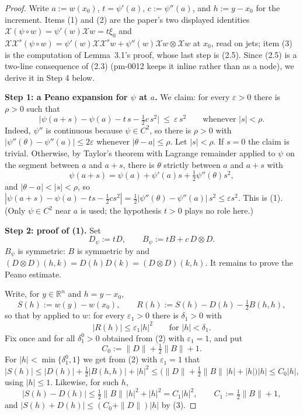 \begin{proof}
Write $a:=w(x_0)$, $t=\psi'(a)$, $c:=\psi''(a)$, and $h:=y-x_0$ for the increment. Items
(1) and (2) are the paper's two displayed identities
$\mathcal X(\psi\circ w)=\psi'(w)\mathcal Xw=t\xi_0$ and
$\mathcal X\mathcal X^{s}(\psi\circ w)=\psi'(w)\mathcal X\mathcal X^{s}w+\psi''(w)\mathcal Xw\otimes\mathcal Xw$
at $x_0$, read on jets; item (3) is the computation of Lemma~3.1's proof, whose last step is
(2.5). Since (2.5) is a two-line consequence of (2.3) (pm-0012 keeps it
inline rather than as a node), we derive it in Step 4 below.

\medskip\noindent\textbf{Step 1: a Peano expansion for $\psi$ at $a$.} We claim: for every
$\varepsilon>0$ there is $\rho>0$ such that
\[
 \Big|\psi(a+s)-\psi(a)-t\,s-\tfrac12c\,s^{2}\Big|\ \le\ \varepsilon\,s^{2}
 \qquad\text{whenever }|s|<\rho. \tag{1}
\]
Indeed, $\psi''$ is continuous because $\psi\in C^{2}$, so there is $\rho>0$ with
$|\psi''(\theta)-\psi''(a)|\le2\varepsilon$ whenever $|\theta-a|\le\rho$. Let $|s|<\rho$.
If $s=0$ the claim is trivial. Otherwise, by Taylor's theorem with Lagrange remainder
applied to $\psi$ on the segment between $a$ and $a+s$, there is $\theta$ strictly between
$a$ and $a+s$ with
\[
 \psi(a+s)=\psi(a)+\psi'(a)s+\tfrac12\psi''(\theta)s^{2},
\]
and $|\theta-a|<|s|<\rho$, so
$|\psi(a+s)-\psi(a)-ts-\frac12cs^{2}|=\frac12|\psi''(\theta)-\psi''(a)|\,s^{2}\le\varepsilon s^{2}$.
This is (1). (Only $\psi\in C^{2}$ near $a$ is used; the hypothesis $t>0$ plays no role
here.)

\medskip\noindent\textbf{Step 2: proof of (1).} Set
\[
 D_\psi:=tD,\qquad B_\psi:=tB+c\,D\otimes D .
\]
$B_\psi$ is symmetric: $B$ is symmetric by  and
$(D\otimes D)(h,k)=D(h)D(k)=(D\otimes D)(k,h)$. It remains to prove the Peano estimate.

Write, for $y\in\mathbb R^{n}$ and $h=y-x_0$,
\[
 S(h):=w(y)-w(x_0),\qquad R(h):=S(h)-D(h)-\tfrac12B(h,h),
\]
so that by  applied to $w$: for every $\varepsilon_1>0$ there is
$\delta_1>0$ with
\[
 |R(h)|\le\varepsilon_1|h|^{2}\qquad\text{for }|h|<\delta_1. \tag{2}
\]
Fix once and for all $\delta_1^{0}>0$ obtained from (2) with $\varepsilon_1=1$, and put
\[
 C_0:=\|D\|+\tfrac12\|B\|+1 .
\]
For $|h|<\min\{\delta_1^{0},1\}$ we get from (2) with $\varepsilon_1=1$ that
\[
 |S(h)|\le|D(h)|+\tfrac12|B(h,h)|+|h|^{2}\le\big(\|D\|+\tfrac12\|B\|\,|h|+|h|\big)|h|
 \le C_0|h|, \tag{3}
\]
using $|h|\le1$. Likewise, for such $h$,
\[
 |S(h)-D(h)|\le\tfrac12\|B\|\,|h|^{2}+|h|^{2}=C_1|h|^{2},\qquad
 C_1:=\tfrac12\|B\|+1 , \tag{4}
\]
and $|S(h)+D(h)|\le(C_0+\|D\|)|h|$ by (3).


\end{proof}
